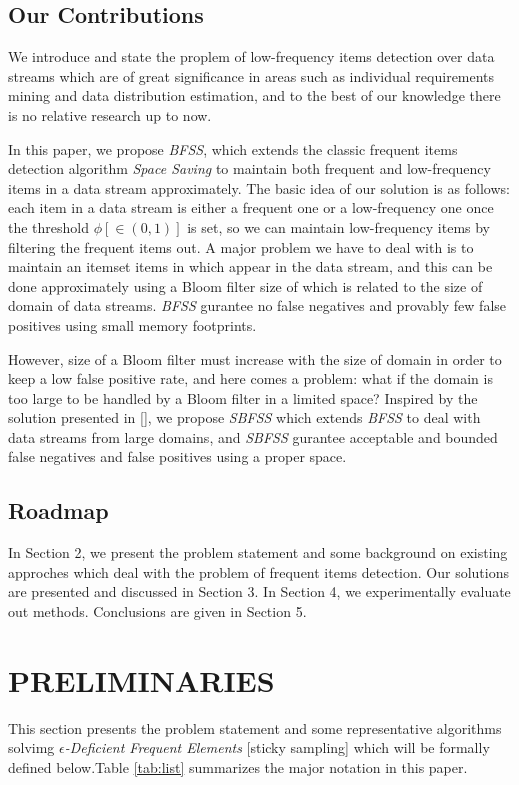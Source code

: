 \documentclass[conference]{IEEEtran}
\begin{document}
\subsection{Our Contributions}
We introduce and state the proplem of low-frequency items detection over data streams which are of great significance in areas such as individual requirements mining and data distribution estimation, and to the best of our knowledge there is no relative research up to now.\par

In this paper, we propose \emph{BFSS}, which extends the classic frequent items detection algorithm \emph{Space Saving} to maintain both frequent and low-frequency items in a data stream approximately. The basic idea of our solution is as follows: each item in a data stream is either a frequent one or a low-frequency one once the threshold $\phi[\in (0,1)]$ is set, so we can maintain low-frequency items by filtering the frequent items out. A major problem we have to deal with is to maintain an itemset items in which appear in the data stream, and this can be done approximately using a Bloom filter size of which is related to the size of domain of data streams. \emph{BFSS} gurantee no false negatives and provably few false positives using small memory footprints.\par

However, size of a Bloom filter must increase with the size of domain in order to keep a low false positive rate, and here comes a problem: what if the domain is too large to be handled by a Bloom filter in a limited space? Inspired by the solution presented in [], we propose \emph{SBFSS} which extends \emph{BFSS} to deal with data streams from large domains, and \emph{SBFSS} gurantee acceptable and bounded false negatives and false positives using a proper space.

\subsection{Roadmap}
In Section 2, we present the problem statement and some background on existing approches which deal with the problem of frequent items detection. Our solutions are presented and discussed in Section 3. In Section 4, we experimentally evaluate out methods. Conclusions are given in Section 5.

\section{PRELIMINARIES}
This section presents the problem statement and some representative algorithms solvimg $\epsilon$\emph{-Deficient Frequent Elements} [sticky sampling] which will be formally defined below.Table \ref{tab:list} summarizes the major notation in this paper.
\end{document}
